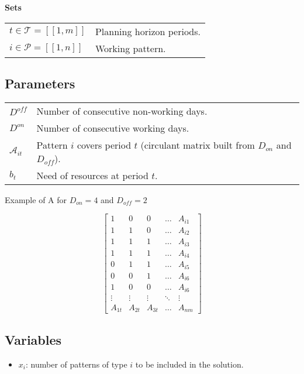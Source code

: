 \documentclass[a4paper,11pt]{article}
\begin{document}
    \textbf{Sets}

    \begin{tabular}{ll}
    $t \in \mathcal{T} = [\![1, m]\!]$ & Planning horizon periods. \\
    $i \in \mathcal{P} = [\![1, n]\!]$ & Working pattern.\\
    \end{tabular}

    \vskip 0.3cm

    \subsection{Parameters}

    \begin{tabular}{ll}
        $D^{off}$ & Number of consecutive non-working days. \\
        $D^{on}$ & Number of consecutive working days. \\
        $\mathcal{A}_{it}$ & Pattern $i$ covers period $t$ (circulant matrix built from $D_{on}$ and $D_{off}$).\\
        $b_{t}$ & Need of resources at period $t$. \\
    \end{tabular}

    \vskip 0.3cm

    Example of A for $D_{on}=4$ and $D_{off}=2$

    $$
    \begin{bmatrix}
        1 & 0 & 0 & \dots  & A_{i1} \\
        1 & 1 & 0 & \dots  & A_{i2} \\
        1 & 1 & 1 & \dots  & A_{i3} \\
        1 & 1 & 1 & \dots  & A_{i4} \\
        0 & 1 & 1 & \dots  & A_{i5} \\
        0 & 0 & 1 & \dots  & A_{i6} \\
        1 & 0 & 0 & \dots  & A_{i6} \\
        \vdots & \vdots & \vdots & \ddots & \vdots \\
        A_{1t} & A_{2t} & A_{3t} & \dots  & A_{nm}
    \end{bmatrix}
    $$

    \subsection{Variables}

    \begin{itemize}
     \item $x_i$: number of patterns of type $i$ to be included in the solution.
    \end{itemize}
\end{document}
